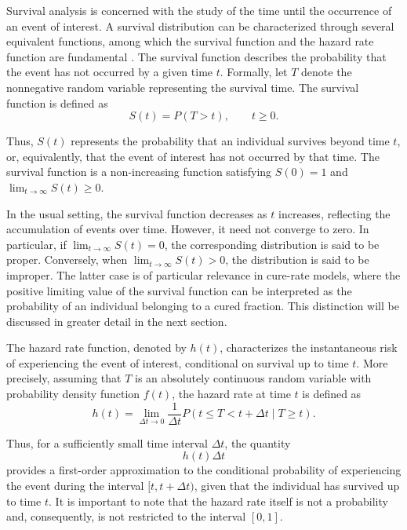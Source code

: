 Survival analysis is concerned with the study of the time until the occurrence of an event of interest. A survival distribution can be characterized through several equivalent functions, among which the survival function and the hazard rate function are fundamental \cite{moore2016applied}. The survival function describes the probability that the event has not occurred by a given time $t$. Formally, let $T$ denote the nonnegative random variable representing the survival time. The survival function is defined as
\begin{equation}
\label{eq:surv_function}
S(t) = P(T > t), \qquad t \geq 0.
\end{equation}

Thus, $S(t)$ represents the probability that an individual survives beyond time $t$, or,
equivalently, that the event of interest has not occurred by that time. The survival
function is a non-increasing function satisfying $S(0)=1$ and $\lim_{t\to\infty} S(t) \geq 0$.

In the usual setting, the survival function decreases as $t$ increases, reflecting the
accumulation of events over time. However, it need not converge to zero. In particular,
if $\lim_{t\to\infty} S(t) = 0$, the corresponding distribution is said to be proper.
Conversely, when $\lim_{t\to\infty} S(t) > 0$, the distribution is said to be
improper. The latter case is of particular relevance in cure-rate models, where
the positive limiting value of the survival function can be interpreted as the
probability of an individual belonging to a cured fraction. This distinction will be
discussed in greater detail in the next section.

The hazard rate function, denoted by $h(t)$, characterizes the instantaneous risk of experiencing the event of interest, conditional on survival up to time $t$. More precisely, assuming that $T$ is an absolutely continuous random variable with probability density function $f(t)$, the hazard rate at time $t$ is defined as
\begin{equation}
\label{eq:hazard_function}
h(t)
=
\lim_{\Delta t \to 0}
\frac{1}{\Delta t}
P\left(t \leq T < t+\Delta t \mid T \geq t\right).
\end{equation}

Thus, for a sufficiently small time interval $\Delta t$, the quantity
\[
h(t)\Delta t
\]
provides a first-order approximation to the conditional probability of experiencing the
event during the interval $[t,t+\Delta t)$, given that the individual has survived up
to time $t$. It is important to note that the hazard rate itself is not a probability
and, consequently, is not restricted to the interval $[0,1]$.

